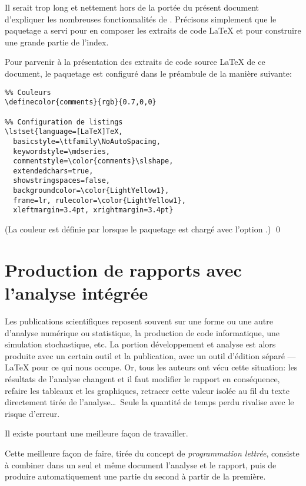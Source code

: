 Il serait trop long et nettement hors de la portée du présent document
d'expliquer les nombreuses fonctionnalités de .
Précisons simplement que le paquetage a servi pour en composer les
extraits de code {\LaTeX} et pour construire une grande partie de
l'index.

\begin{exemple}
  \label{ex:trucs:listings}
  Pour parvenir à la présentation des extraits de code source {\LaTeX}
  de ce document, le paquetage  est configuré dans le
  préambule de la manière suivante:
\begin{lstlisting}
%% Couleurs
\definecolor{comments}{rgb}{0.7,0,0}

%% Configuration de listings
\lstset{language=[LaTeX]TeX,
  basicstyle=\ttfamily\NoAutoSpacing,
  keywordstyle=\mdseries,
  commentstyle=\color{comments}\slshape,
  extendedchars=true,
  showstringspaces=false,
  backgroundcolor=\color{LightYellow1},
  frame=lr, rulecolor=\color{LightYellow1},
  xleftmargin=3.4pt, xrightmargin=3.4pt}
\end{lstlisting}
  (La couleur  est définie par  lorsque
  le paquetage est chargé avec l'option .)
  \qed
\end{exemple}



\section{Production de rapports avec l'analyse intégrée}
\label{sec:trucs:sweave}

Les publications scientifiques reposent souvent sur une forme ou une
autre d'analyse numérique ou statistique, la production de code
informatique, une simulation stochastique, etc. La portion
développement et analyse est alors produite avec un certain outil
et la publication, avec un outil d'édition séparé --- {\LaTeX} pour ce
qui nous occupe. Or, tous les auteurs ont vécu cette situation: les
résultats de l'analyse changent et il faut modifier le rapport en
conséquence, refaire les tableaux et les graphiques, retracer cette
valeur isolée au fil du texte directement tirée de l'analyse\dots\
Seule la quantité de temps perdu rivalise avec le risque d'erreur.

Il existe pourtant une meilleure façon de travailler.

Cette meilleure façon de faire, tirée du concept de
\emph{programmation lettrée}, consiste à combiner dans un seul et même
document l'analyse et le rapport, puis de produire automatiquement une
partie du second à partir de la première.

